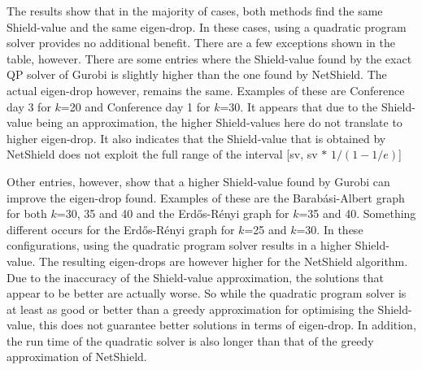 \documentclass[11pt]{article}
\theoremstyle{definition}
\begin{document}
The results show that in the majority of cases, both methods find the same Shield-value and the same eigen-drop. In these cases, using a quadratic program solver provides no additional benefit. There are a few exceptions shown in the table, however. There are some entries where the Shield-value found by the exact QP solver of Gurobi is slightly higher than the one found by NetShield. The actual eigen-drop however, remains the same. Examples of these are Conference day 3 for $k$=20 and Conference day 1 for $k$=30. It appears that due to the Shield-value being an approximation, the higher Shield-values here do not translate to higher eigen-drop. It also indicates that the Shield-value that is obtained by NetShield does not exploit the full range of the interval [sv, sv $*$ $1/(1-1/e)$]

Other entries, however, show that a higher Shield-value found by Gurobi can improve the eigen-drop found. Examples of these are the Barab\'asi-Albert graph for both $k$=30, 35 and 40 and the Erd\H{o}s-R\'enyi graph for $k$=35 and 40. Something different occurs for the Erd\H{o}s-R\'enyi graph for $k$=25 and $k$=30. In these configurations, using the quadratic program solver results in a higher Shield-value. The resulting eigen-drops are however higher for the NetShield algorithm. Due to the inaccuracy of the Shield-value approximation, the solutions that appear to be better are actually worse. So while the quadratic program solver is at least as good or better than a greedy approximation for optimising the Shield-value, this does not guarantee better solutions in terms of eigen-drop. In addition, the run time of the quadratic solver is also longer than that of the greedy approximation of NetShield.
\end{document}
